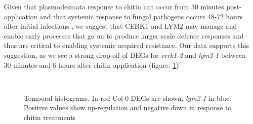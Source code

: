 \documentclass[../main.tex]{subfiles}
\begin{document}
Given that plasmodesmata response to chitin can occur from 30 minutes
post-application \cite{chevalChitinPerceptionPlasmodesmata2019} and that
systemic response to fungal pathogens occurs 48-72 hours after initial
infections \cite{gaoSignalRegulatorsSystemic2015}, we suggest that CERK1 and
LYM2 may manage and enable early processes that go on to produce larger scale
defence responses and thus are critical to enabling systemic acquired
resistance. Our data supports this suggestion, as we see a strong drop-off of
DEGs for \textit{cerk1-2} and \textit{lym2-1} between 30 minutes and 6 hours
after chitin application (figure: \ref{fig:tmpHist})


\begin{figure}[!ht]
  \centering
  \\
  \caption{Temporal histograms. In red Col-0 DEGs are shown, \textit{lym2-1} in
    blue. Positive values show up-regulation and negative down in response to
    chitin treatments}
  \label{fig:tmpHist}
\end{figure}
\end{document}
